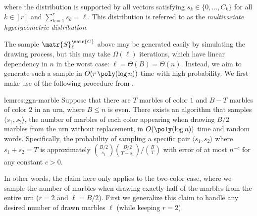 where the distribution is supported by all vectors satisfying $s_k \in \{0, \ldots, C_k\}$ for all $k \in [r]$ and $\sum_{k=1}^{r} s_k = \ell$. This distribution is referred to as the \emph{multivariate hypergeometric distribution}.

The sample $\matr{S}^\matr{C}_\ell$ above may be generated easily by simulating the drawing process, but this may take $\Omega(\ell)$ iterations, which have linear dependency in $n$ in the worst case: $\ell = \Theta(B) = \Theta(n)$. Instead, we aim to generate such a sample in $O(r\,\poly(\log n))$ time with high probability. We first make use of the following procedure from \cite{huge}.

\begin{restatable}{lem}{res:ggn-marble}\label{claim:ggn}
Suppose that there are $T$ marbles of color $1$ and $B-T$ marbles of color $2$ in an urn,
where $B \leq n$ is even. There exists an algorithm that samples $\langle s_1, s_2 \rangle$,
the number of marbles of each color appearing when drawing $B/2$ marbles from the urn without replacement,
in $O(\poly(\log n))$ time and random words.
Specifically, the probability of sampling a specific pair $\langle s_1, s_2 \rangle$ where $s_1 + s_2 = T$
is approximately ${B/2 \choose s_1}{B/2 \choose T-s_1}/{B \choose T}$ with error of at most $n^{-c}$ for any constant $c>0$.
\end{restatable}

In other words, the claim here only applies to the two-color case,
where we sample the number of marbles when drawing exactly half of the marbles from the entire urn ($r=2$ and $\ell = B/2$).
First we generalize this claim to handle any desired number of drawn marbles $\ell$ (while keeping $r=2$).

